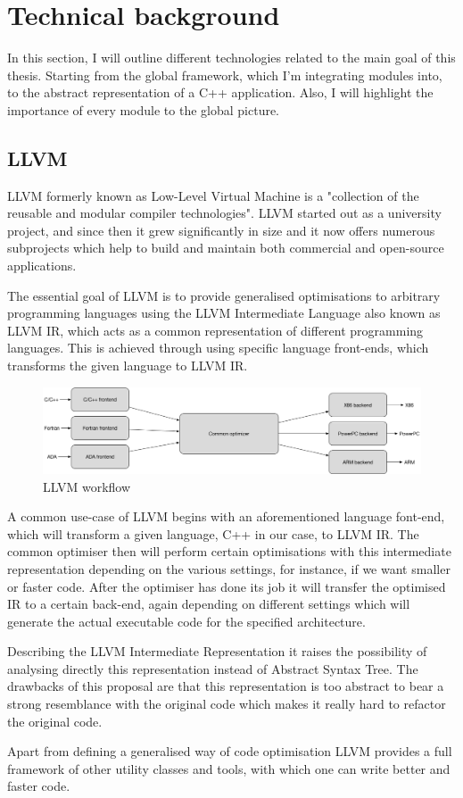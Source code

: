 \section{Technical background}
\par In this section, I will outline different technologies related to the main goal of this thesis. Starting from the global framework, which I'm integrating modules into, to the abstract representation of a C++ application. Also, I will highlight the importance of every module to the global picture.

\subsection{LLVM}
\par LLVM formerly known as Low-Level Virtual Machine is a "collection of the reusable and modular compiler technologies"\cite{llvm_mainpage}. LLVM started out as a university project\cite{LLVM:CGO04}, and since then it grew significantly in size and it now offers numerous subprojects which help to build and maintain both commercial and open-source applications. \medskip
\par The essential goal of LLVM is to provide generalised optimisations to arbitrary programming languages using the LLVM Intermediate Language also known as LLVM IR, which acts as a common representation of different programming languages. This is achieved through using specific language front-ends, which transforms the given language to LLVM IR.
\begin{figure}[h]
    \caption{LLVM workflow}
    \includegraphics[scale=0.33]{images/llvm_flow}
\end{figure}
\par A common use-case of LLVM begins with an aforementioned language font-end, which will transform a given language, C++ in our case, to LLVM IR. The common optimiser then will perform certain optimisations with this intermediate representation depending on the various settings, for instance, if we want smaller or faster code. After the optimiser has done its job it will transfer the optimised IR to a certain back-end, again depending on different settings which will generate the actual executable code for the specified architecture. \medskip
\par Describing the LLVM Intermediate Representation it raises the possibility of analysing directly this representation instead of Abstract Syntax Tree. The drawbacks of this proposal are that this representation is too abstract to bear a strong resemblance with the original code which makes it really hard to refactor the original code.
\par Apart from defining a generalised way of code optimisation LLVM provides a full framework of other utility classes and tools, with which one can write better and faster code.

